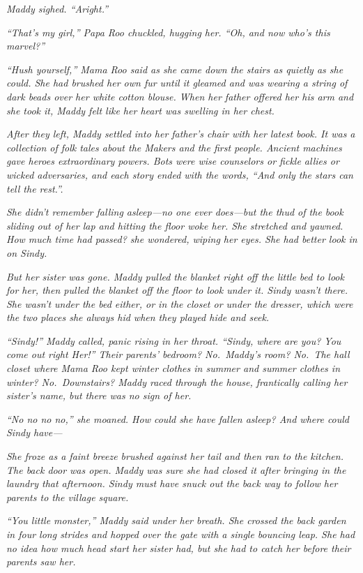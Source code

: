 \documentclass[10pt]{article}
\begin{document}
\emph{Maddy sighed. ``Aright.''}

\emph{``That's my girl,'' Papa Roo chuckled, hugging her. ``Oh, and now
who's this marvel?''}

\emph{``Hush yourself,'' Mama Roo said as she came down the stairs as
quietly as she could. She had brushed her own fur until it gleamed and
was wearing a string of dark beads over her white cotton blouse. When
her father offered her his arm and she took it, Maddy felt like her
heart was swelling in her chest.}

\emph{After they left, Maddy settled into her father's chair with her
latest book. It was a collection of folk tales about the Makers and the
first people. Ancient machines gave heroes extraordinary powers. Bots
were wise counselors or fickle allies or wicked adversaries, and each
story ended with the words, ``And only the stars can tell the rest.''.}

\emph{She didn't remember falling asleep---no one ever does---but the
thud of the book sliding out of her lap and hitting the floor woke her.
She stretched and yawned. How much time had passed? she wondered, wiping
her eyes. She had better look in on Sindy.}

\emph{But her sister was gone. Maddy pulled the blanket right off the
little bed to look for her, then pulled the blanket off the floor to
look under it. Sindy wasn't there. She wasn't under the bed either, or
in the closet or under the dresser, which were the two places she always
hid when they played hide and seek.}

\emph{``Sindy!'' Maddy called, panic rising in her throat. ``Sindy,
where are you? You come out right Her!'' Their parents' bedroom?
No.~Maddy's room? No.~The hall closet where Mama Roo kept winter clothes
in summer and summer clothes in winter? No.~Downstairs? Maddy raced
through the house, frantically calling her sister's name, but there was
no sign of her.}

\emph{``No no no no,'' she moaned. How could she have fallen asleep? And
where could Sindy have---}

\emph{She froze as a faint breeze brushed against her tail and then ran
to the kitchen. The back door was open. Maddy was sure she had closed it
after bringing in the laundry that afternoon. Sindy must have snuck out
the back way to follow her parents to the village square.}

\emph{``You little monster,'' Maddy said under her breath. She crossed
the back garden in four long strides and hopped over the gate with a
single bouncing leap. She had no idea how much head start her sister
had, but she had to catch her before their parents saw her.}
\end{document}
